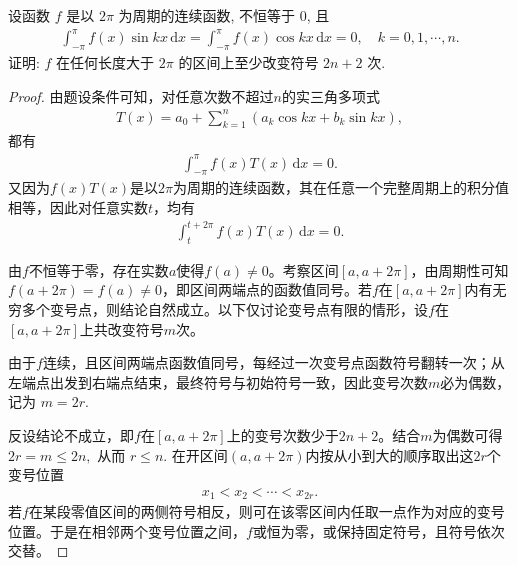 \documentclass[../../main.tex]{subfiles}%
\begin{document}
\begin{example}
设函数 $f$ 是以 $2\pi$ 为周期的连续函数, 不恒等于 $0$, 且
\begin{align*}
\int_{-\pi}^{\pi} f(x) \sin k x\,\mathrm{d}x = \int_{-\pi}^{\pi} f(x) \cos k x\,\mathrm{d}x = 0, \quad k=0,1,\cdots,n.
\end{align*}
证明: $f$ 在任何长度大于 $2\pi$ 的区间上至少改变符号 \(2n+2\) 次.
\end{example}
\begin{proof}

由题设条件可知，对任意次数不超过$n$的实三角多项式
\begin{align*}
T(x) = a_0 + \sum\limits_{k=1}^{n} \left( a_k \cos kx + b_k \sin kx \right),
\end{align*}
都有
\begin{align*}
\int_{-\pi}^{\pi} f(x) T(x)\,\mathrm{d}x = 0.
\end{align*}
又因为$f(x)T(x)$是以$2\pi$为周期的连续函数，其在任意一个完整周期上的积分值相等，因此对任意实数$t$，均有
\begin{align}
\int_{t}^{t+2\pi} f(x) T(x)\,\mathrm{d}x = 0.
\label{eq:period_int_zero_4h6q}
\end{align}

由$f$不恒等于零，存在实数$a$使得$f(a)\neq 0$。考察区间$[a, a+2\pi]$，由周期性可知$f(a+2\pi)=f(a)\neq 0$，即区间两端点的函数值同号。若$f$在$[a,a+2\pi]$内有无穷多个变号点，则结论自然成立。以下仅讨论变号点有限的情形，设$f$在$[a,a+2\pi]$上共改变符号$m$次。

由于$f$连续，且区间两端点函数值同号，每经过一次变号点函数符号翻转一次；从左端点出发到右端点结束，最终符号与初始符号一致，因此变号次数$m$必为偶数，记为
$m = 2r.$

反设结论不成立，即$f$在$[a,a+2\pi]$上的变号次数少于$2n+2$。结合$m$为偶数可得
$2r = m \leqslant 2n,$
从而
$r \leqslant n.$
在开区间$(a,a+2\pi)$内按从小到大的顺序取出这$2r$个变号位置
\begin{align*}
x_1 < x_2 < \cdots < x_{2r}.
\end{align*}
若$f$在某段零值区间的两侧符号相反，则可在该零区间内任取一点作为对应的变号位置。于是在相邻两个变号位置之间，$f$或恒为零，或保持固定符号，且符号依次交替。


\end{proof}
\end{document}
